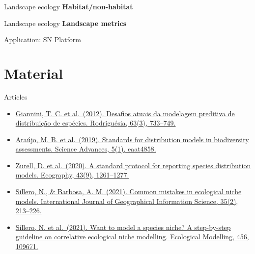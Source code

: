 \documentclass[
  ignorenonframetext,
]{beamer}
\begin{document}
\begin{frame}{Landscape ecology}
\label{landscape-ecology}
\textbf{Habitat/non-habitat}
\end{frame}

\begin{frame}{Landscape ecology}
\label{landscape-ecology-1}
\textbf{Landscape metrics}
\end{frame}

\begin{frame}{Application: SN Platform}
\label{application-sn-platform}
\end{frame}

\section{Material}\label{material}

\begin{frame}{Articles}
\label{articles}
\begin{itemize}
\item
  \href{https://doi.org/10.1590/S2175-78602012000300017}{Giannini, T. C.
  et al.~(2012). Desafios atuais da modelagem preditiva de distribuição
  de espécies. Rodriguésia, 63(3), 733--749.}
\item
  \href{https://doi.org/10.1126/sciadv.aat4858}{Araújo, M. B. et
  al.~(2019). Standards for distribution models in biodiversity
  assessments. Science Advances, 5(1), eaat4858.}
\item
  \href{https://doi.org/10.1111/ecog.04960}{Zurell, D. et al.~(2020). A
  standard protocol for reporting species distribution models.
  Ecography, 43(9), 1261--1277.}
\item
  \href{https://doi.org/10.1080/13658816.2020.1798968}{Sillero, N., \&
  Barbosa, A. M. (2021). Common mistakes in ecological niche models.
  International Journal of Geographical Information Science, 35(2),
  213--226.}
\item
  \href{https://doi.org/10.1016/j.ecolmodel.2021.109671}{Sillero, N. et
  al.~(2021). Want to model a species niche? A step-by-step guideline on
  correlative ecological niche modelling. Ecological Modelling, 456,
  109671.}
\end{itemize}
\end{frame}
\end{document}
